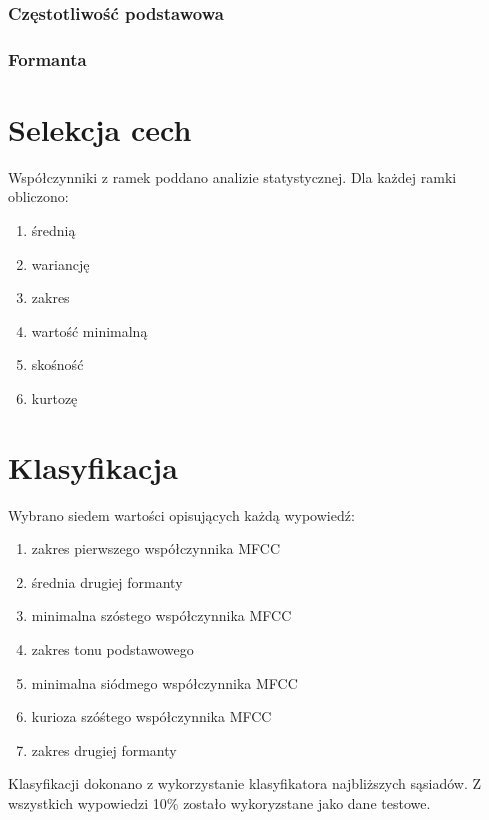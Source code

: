 \documentclass[a4paper,12pt,twoside,openany]{report}
\begin{document}
    \subsubsection{Częstotliwość podstawowa}
    \subsubsection{Formanta}
    \section{Selekcja cech}
    Współczynniki z ramek poddano analizie statystycznej.
    Dla każdej ramki obliczono:
    \begin{enumerate}
        \item średnią
        \item wariancję
        \item zakres
        \item wartość minimalną
        \item skośność
        \item kurtozę
    \end{enumerate}

    \section{Klasyfikacja}
    Wybrano siedem wartości opisujących każdą wypowiedź:
    \begin{enumerate}
        \item zakres pierwszego współczynnika MFCC
        \item średnia drugiej formanty
        \item minimalna szóstego współczynnika MFCC
        \item zakres tonu podstawowego
        \item minimalna siódmego współczynnika MFCC
        \item kurioza szóśtego współczynnika MFCC
        \item zakres drugiej formanty
    \end{enumerate}
    Klasyfikacji dokonano z wykorzystanie klasyfikatora najbliższych sąsiadów.
    Z wszystkich wypowiedzi 10\% zostało wykoryzstane jako dane testowe.
    {}
    
\end{document}
